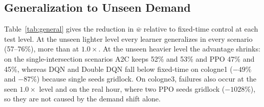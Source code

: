 \begin{table}[t]
\caption{Average Total Waiting Time per Vehicle (s)}
\label{tab:main}
\centering
\footnotesize
\setlength{\tabcolsep}{3pt}
\end{table}

\subsection{Generalization to Unseen Demand}
Table~\ref{tab:general} gives the reduction in $\bar{w}$ relative to fixed-time control at each test level. At the unseen lighter level every learner generalizes in every scenario (57--76\%), more than at $1.0\times$. At the unseen heavier level the advantage shrinks: on the single-intersection scenarios A2C keeps 52\% and 53\% and PPO 47\% and 45\%, whereas DQN and Double DQN fall below fixed-time on cologne1 ($-49\%$ and $-87\%$) because single seeds gridlock. On cologne3, failures also occur at the seen $1.0\times$ level and on the real hour, where two PPO seeds gridlock ($-1028\%$), so they are not caused by the demand shift alone.

